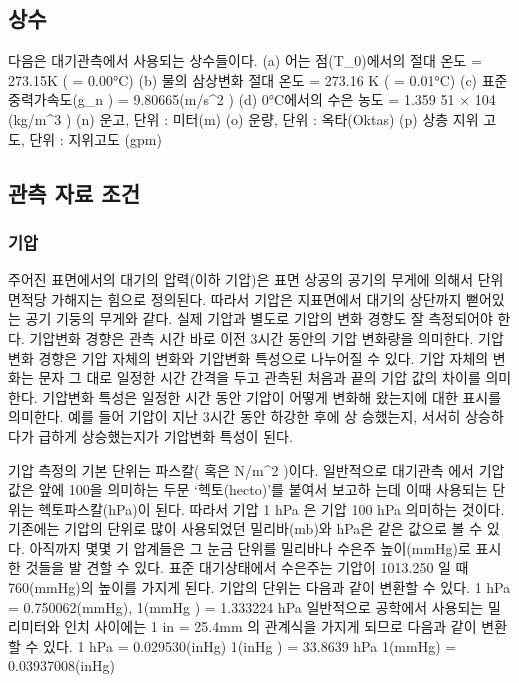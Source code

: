 \subsection{상수}
다음은 대기관측에서 사용되는 상수들이다.
(a) 어는 점(T_0)에서의 절대 온도 = 273.15K ( = 0.00°C)
(b) 물의 삼상변화 절대 온도 = 273.16 K ( = 0.01°C)
(c) 표준 중력가속도(g_n ) = 9.80665(m/s^2 )
(d) 0°C에서의 수은 농도 = 1.359 51 × 104 (kg/m^3 )
(n) 운고, 단위 : 미터(m)
(o) 운량, 단위 : 옥타(Oktas)
(p) 상층 지위 고도, 단위 : 지위고도 (gpm)

\subsection{관측 자료 조건}
\subsubsection{기압}

주어진 표면에서의 대기의 압력(이하 기압)은 표면 상공의 공기의 무게에
의해서 단위 면적당 가해지는 힘으로 정의된다. 따라서 기압은 지표면에서
대기의 상단까지 뻗어있는 공기 기둥의 무게와 같다. 실제 기압과 별도로
기압의 변화 경향도 잘 측정되어야 한다. 기압변화 경향은 관측 시간 바로
이전 3시간 동안의 기압 변화량을 의미한다. 기압변화 경향은 기압 자체의
변화와 기압변화 특성으로 나누어질 수 있다. 기압 자체의 변화는 문자 그
대로 일정한 시간 간격을 두고 관측된 처음과 끝의 기압 값의 차이를 의미
한다. 기압변화 특성은 일정한 시간 동안 기압이 어떻게 변화해 왔는지에
대한 표시를 의미한다. 예를 들어 기압이 지난 3시간 동안 하강한 후에 상
승했는지, 서서히 상승하다가 급하게 상승했는지가 기압변화 특성이 된다.


기압 측정의 기본 단위는 파스칼( 혹은 N/m^2 )이다. 일반적으로 대기관측
에서 기압값은 앞에 100을 의미하는 두문 ‘헥토(hecto)’를 붙여서 보고하
는데 이때 사용되는 단위는 헥토파스칼(hPa)이 된다. 따라서 기압 1 hPa 은 기압 100 hPa \을 의미하는 것이다. 기존에는 기압의 단위로 많이 사용되었던 밀리바(mb)와 hPa은 같은 값으로 볼 수 있다. 아직까지 몇몇 기 압계들은 그 눈금 단위를 밀리바나 수은주 높이(mmHg)로 표시한 것들을 발
견할 수 있다. 표준 대기상태에서 수은주는 기압이 1013.250 일 때
760(mmHg)의 높이를 가지게 된다.
기압의 단위는 다음과 같이 변환할 수 있다.
1 hPa = 0.750062(mmHg), 
1(mmHg ) = 1.333224 hPa
일반적으로 공학에서 사용되는 밀리미터와 인치 사이에는 1 in = 25.4mm
의 관계식을 가지게 되므로 다음과 같이 변환할 수 있다.
1 hPa = 0.029530(inHg)
1(inHg ) = 33.8639 hPa
1(mmHg) = 0.03937008(inHg)

